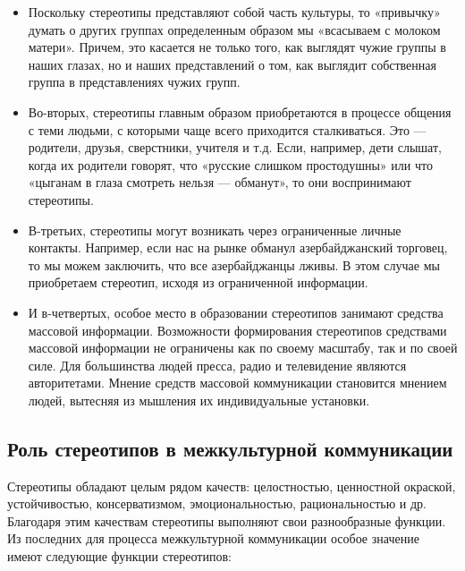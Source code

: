 \documentclass[14pt, a4paper] {ncc}
\begin{document}
		\begin{itemize}
    		\item Поскольку стереотипы представляют собой часть культуры, то
    		«привычку» думать о других группах определенным образом мы «всасываем
    		с молоком матери». Причем, это касается не только того, как выглядят
    		чужие группы в наших глазах, но и наших представлений о том, как выглядит
    		собственная группа в представлениях чужих групп.

			\item Во-вторых, стереотипы главным образом приобретаются в
			процессе общения с теми людьми, с которыми чаще всего приходится
			сталкиваться. Это — родители, друзья, сверстники, учителя и
			т.д. Если, например, дети слышат, когда их родители говорят, что
			«русские слишком простодушны» или что «цыганам в глаза смотреть
			нельзя — обманут», то они воспринимают стереотипы.

			\item В-третьих, стереотипы могут возникать через ограниченные личные
			контакты. Например, если нас на рынке обманул азербайджанский
			торговец, то мы можем заключить, что все азербайджанцы лживы. В этом
			случае мы приобретаем стереотип, исходя из ограниченной информации.

			\item И в-четвертых, особое место в образовании стереотипов
			занимают средства массовой информации. Возможности формирования
			стереотипов средствами массовой информации не ограничены как по
			своему масштабу, так и по своей силе. Для большинства людей пресса,
			радио и телевидение являются авторитетами. Мнение средств массовой
			коммуникации становится мнением людей, вытесняя из мышления их
			индивидуальные установки.\cite{Sadoh2}
		\end{itemize}

	\subsection{Роль стереотипов в межкультурной коммуникации}

    Стереотипы обладают целым рядом качеств: целостностью, ценностной окраской,
    устойчивостью, консерватизмом, эмоциональностью, рациональностью и
    др. Благодаря этим качествам стереотипы выполняют свои разнообразные
    функции. Из последних для процесса межкультурной коммуникации особое
    значение имеют следующие функции стереотипов:
\end{document}
